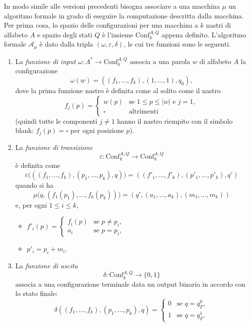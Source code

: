 In modo simile alle versioni precedenti bisogna associare a una macchina $\mu$ un algoritmo formale in grado di eseguire la computazione descritta dalla macchina. Per prima cosa, lo spazio delle configurazioni per una macchina a $k$ nastri di alfabeto $A$ e spazio degli stati $Q$ è l'insieme $\mathrm{Conf}_k^{A,Q}$ appena definito. L'algoritmo formale $\mathcal{A}_\mu$ è dato dalla tripla $(\omega,\varepsilon,\delta)$, le cui tre funzioni sono le seguenti.
\begin{enumerate}
    \item La \emph{funzione di input} $\omega\colon A^*\to\mathrm{Conf}_k^{A,Q}$ associa a una parola $w$ di alfabeto $A$ la configurazione
    \[
    \omega(w)=((f_1,\dots,f_k),(1,\dots,1),q_0),
    \]
    dove la prima funzione nastro è definita come al solito come il nastro
    \[
    f_j(p)=\begin{cases}
        w(p) & \text{se } 1\leq p\leq |w| \text{ e } j=1,\\
        \square & \text{altrimenti}
    \end{cases}
    \]
    (quindi tutte le componenti $j\neq 1$ hanno il nastro riempito con il simbolo blank: $f_j(p)=\square$ per ogni posizione $p$).
    \item La \emph{funzione di transizione}
    \[
    \varepsilon\colon \mathrm{Conf}_k^{A,Q}\to\mathrm{Conf}_k^{A,Q}
    \]
    è definita come
    \[
    \varepsilon\bigl(((f_1,\dots,f_k),(p_1,\dots,p_k),q)\bigr)=((f'_1,\dots,f'_k),(p'_1,\dots,p'_k),q')
    \]
    quando si ha
    \[
    \mu\bigl(q,(f_1(p_1),\dots,f_k(p_k))\bigr)=(q',(a_1,\dots,a_k),(m_1,\dots,m_k))
    \]
    e, per ogni $1\leq i\leq k$,
    \begin{itemize}
        \item $f'_i(p)=\begin{cases} f_i(p) & \text{se } p\neq p_i,\\ a_i & \text{se } p=p_i,\end{cases}$
        \item $p'_i=p_i+m_i$.
    \end{itemize}
    \item La \emph{funzione di uscita}
    \[
    \delta\colon \mathrm{Conf}_k^{A,Q}\to\{0,1\}
    \]
    associa a una configurazione terminale data un output binario in accordo con lo stato finale:
    \[
    \delta((f_1,\dots,f_k),(p_1,\dots,p_k),q)=\begin{cases}
        0 & \text{se } q=q_F^0,\\
        1 & \text{se } q=q_F^1.
    \end{cases}
    \]
\end{enumerate}




